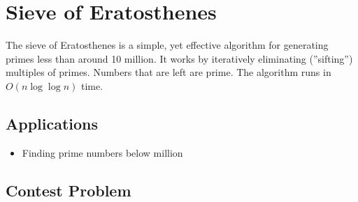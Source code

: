 \section{Sieve of Eratosthenes}
The sieve of Eratosthenes is a simple, yet effective algorithm for generating primes less than around 10 million.
It works by iteratively eliminating (''sifting'') multiples of primes.
Numbers that are left are prime.
The algorithm runs in $O(n\log\log n)$ time.

\subsection{Applications}
\begin{itemize}
	\item	Finding prime numbers below  million
\end{itemize}

\subsection{Contest Problem}
